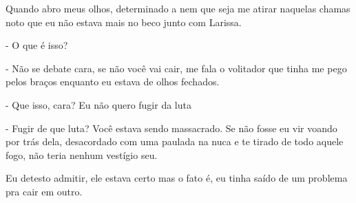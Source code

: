 Quando abro meus olhos, determinado a nem que seja me atirar naquelas chamas noto que eu não estava mais no beco junto com Larissa.

- O que é isso?

- Não se debate cara, se não você vai cair, me fala o volitador que tinha me pego pelos braços enquanto eu estava de olhos fechados.

- Que isso, cara? Eu não quero fugir da luta

- Fugir de que luta? Você estava sendo massacrado. Se não fosse eu vir voando por trás dela, desacordado com uma paulada na nuca e te tirado de todo aquele fogo, não teria nenhum vestígio seu.

Eu detesto admitir, ele estava certo mas o fato é, eu tinha saído de um problema pra cair em outro.

